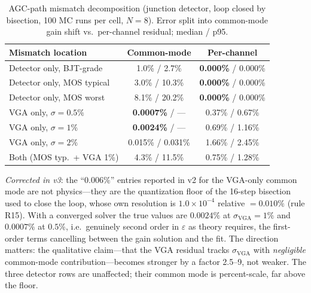 \documentclass[11pt]{article}
\begin{document}
\begin{table}[h]
\centering
\caption{AGC-path mismatch decomposition (junction detector, loop closed by bisection, 100 MC runs per cell, $N=8$). Error split into common-mode gain shift vs.\ per-channel residual; median / p95.}
\label{tab:agcsweep}
\small
\begin{tabular}{lcc}
\toprule
Mismatch location & Common-mode & Per-channel \\
\midrule
Detector only, BJT-grade & 1.0\% / 2.7\% & \textbf{0.000\%} / 0.000\% \\
Detector only, MOS typical & 3.0\% / 10.3\% & \textbf{0.000\%} / 0.000\% \\
Detector only, MOS worst & 8.1\% / 20.2\% & \textbf{0.000\%} / 0.000\% \\
VGA only, $\sigma=0.5\%$ & \textbf{0.0007\%} / --- & 0.37\% / 0.67\% \\
VGA only, $\sigma=1\%$ & \textbf{0.0024\%} / --- & 0.69\% / 1.16\% \\
VGA only, $\sigma=2\%$ & 0.015\% / 0.031\% & 1.66\% / 2.45\% \\
Both (MOS typ.\ + VGA 1\%) & 4.3\% / 11.5\% & 0.75\% / 1.28\% \\
\bottomrule
\end{tabular}
\end{table}

\textit{Corrected in v3}: the ``$0.006\%$'' entries reported in v2 for the VGA-only common mode are not physics---they are the quantization floor of the 16-step bisection used to close the loop, whose own resolution is $1.0\times10^{-4}$ relative $=0.010\%$ (rule R15). With a converged solver the true values are $\mathbf{0.0024\%}$ at $\sigma_{\mathrm{VGA}}=1\%$ and $\mathbf{0.0007\%}$ at $0.5\%$, i.e.\ genuinely second order in $\varepsilon$ as theory requires, the first-order terms cancelling between the gain solution and the fit. The direction matters: the qualitative claim---that the VGA residual tracks $\sigma_{\mathrm{VGA}}$ with \textit{negligible} common-mode contribution---becomes stronger by a factor 2.5--9, not weaker. The three detector rows are unaffected; their common mode is percent-scale, far above the floor.
\end{document}
